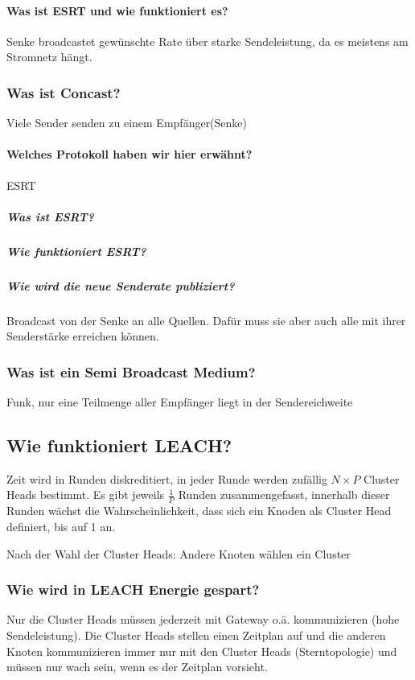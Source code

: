 		\paragraph{Was ist ESRT und wie funktioniert es?}
		Senke broadcastet gewünschte Rate über starke Sendeleistung, da es meistens am Stromnetz hängt.
			
		
		\subsubsection{Was ist Concast?}
		Viele Sender senden zu einem Empfänger(Senke)
		\paragraph{Welches Protokoll haben wir hier erwähnt?}
			ESRT 
			\subparagraph{Was ist ESRT?}
			
			\subparagraph{Wie funktioniert ESRT?}
			
			\subparagraph{Wie wird die neue Senderate publiziert?}
			Broadcast von der Senke an alle Quellen. Dafür muss sie aber auch alle mit ihrer Senderstärke erreichen können.
			
		\subsubsection{Was ist ein Semi\- Broadcast Medium?}
		Funk, nur eine Teilmenge aller Empfänger liegt in der Sendereichweite
		
	\subsection{Wie funktioniert LEACH?}
	Zeit wird in Runden diskreditiert, in jeder Runde werden zufällig $N \times P$ Cluster\- Heads bestimmt.
	Es gibt jeweils $\frac{1}{P}$ Runden zusammengefasst, innerhalb dieser Runden wächst die Wahrscheinlichkeit, dass sich ein Knoden als Cluster\- Head definiert, bis auf 1 an. 
	
	Nach der Wahl der Cluster\- Heads: Andere Knoten wählen ein Cluster
	
	
	\subsubsection{Wie wird in LEACH Energie gespart?}
	Nur die Cluster\- Heads müssen jederzeit mit Gateway o.ä. kommunizieren (hohe Sendeleistung).
	Die Cluster\- Heads stellen einen Zeitplan auf und die anderen Knoten kommunizieren immer nur mit den Cluster\- Heads (Sterntopologie) und müssen nur wach sein, wenn es der Zeitplan vorsieht.
	
